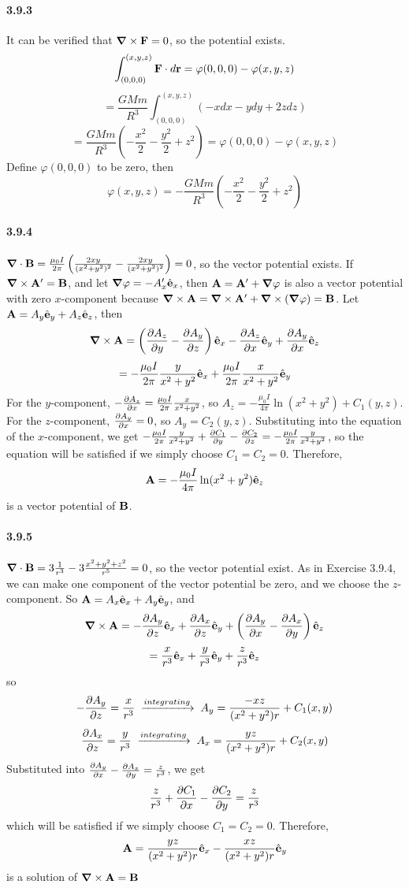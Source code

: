 \documentclass[a4paper]{article}
\begin{document}
\paragraph{3.9.3}
It can be verified that $\boldsymbol{\nabla}\times\mathbf{F}=0$, so the potential exists. 
\[
\int_{(0,0,0)}^{(x,y,z)}\mathbf{F}\cdot d\mathbf{r}=\varphi(0,0,0)-\varphi(x,y,z)
\]
\[
=\frac{GMm}{R^3}\int_{(0,0,0)}^{(x,y,z)}(-xdx-ydy+2zdz)
\]
\[
=\frac{GMm}{R^3}\left(-\frac{x^2}{2}-\frac{y^2}{2}+z^2 \right)=\varphi(0,0,0)-\varphi(x,y,z)
\]
Define $\varphi(0,0,0)$ to be zero, then \[\varphi(x,y,z)=-\frac{GMm}{R^3}\left(-\frac{x^2}{2}-\frac{y^2}{2}+z^2 \right)\] 

\paragraph{3.9.4}
$\boldsymbol{\nabla}\cdot\mathbf{B}=\frac{\mu_0I}{2\pi}\left(\frac{2xy}{(x^2+y^2)^2}-\frac{2xy}{(x^2+y^2)^2} \right)=0$, so the vector potential exists. If $\boldsymbol{\nabla}\times\mathbf{A}'=\mathbf{B}$, and let $\boldsymbol{\nabla}\varphi=-A_x'\hat{\mathbf{e}}_x$, then $\mathbf{A}=\mathbf{A}'+\boldsymbol{\nabla}\varphi$ is also a vector potential with zero $x$-component because  $\boldsymbol{\nabla}\times\mathbf{A}=\boldsymbol{\nabla}\times\mathbf{A}'+\boldsymbol{\nabla}\times(\boldsymbol{\nabla}\varphi)=\mathbf{B}$. Let $\mathbf{A}=A_y\hat{\mathbf{e}}_y+A_z\hat{\mathbf{e}}_z$, then 
\[
\boldsymbol{\nabla}\times\mathbf{A}=\left(\frac{\partial A_z}{\partial y}-\frac{\partial A_y}{\partial z} \right)\hat{\mathbf{e}}_x-\frac{\partial A_z}{\partial x}\hat{\mathbf{e}}_y+\frac{\partial A_y}{\partial x}\hat{\mathbf{e}}_z
\]
\[
=-\frac{\mu_0I}{2\pi}\frac{y}{x^2+y^2}\hat{\mathbf{e}}_x+\frac{\mu_0I}{2\pi}\frac{x}{x^2+y^2}\hat{\mathbf{e}}_y
\]
For the $y$-component, $-\frac{\partial A_z}{\partial x}=\frac{\mu_0I}{2\pi}\frac{x}{x^2+y^2}$, so $A_z=-\frac{\mu_0I}{4\pi}\ln(x^2+y^2)+C_1(y,z)$. For the $z$-component, $\frac{\partial A_y}{\partial x}=0$, so $A_y=C_2(y,z)$. Substituting into the equation of the $x$-component, we get $-\frac{\mu_0I}{2\pi}\frac{y}{x^2+y^2}+\frac{\partial C_1}{\partial y}-\frac{\partial C_2}{\partial z}=-\frac{\mu_0I}{2\pi}\frac{y}{x^2+y^2}$, so the equation will be satisfied if we simply choose $C_1=C_2=0$. Therefore, 
\[
\mathbf{A}=-\frac{\mu_0I}{4\pi}\ln(x^2+y^2)\hat{\mathbf{e}}_z
\]
is a vector potential of $\mathbf{B}$.

\paragraph{3.9.5}
$\boldsymbol{\nabla}\cdot\mathbf{B}=3\frac{1}{r^3}-3\frac{x^2+y^2+z^2}{r^5}=0$, so the vector potential exist. As in Exercise 3.9.4, we can make one component of the vector potential be zero, and we choose the $z$-component. So $\mathbf{A}=A_x\hat{\mathbf{e}}_x+A_y\hat{\mathbf{e}}_y$, and
\[
\boldsymbol{\nabla}\times\mathbf{A}=-\frac{\partial A_y}{\partial z}\hat{\mathbf{e}}_x+\frac{\partial A_x}{\partial z}\hat{\mathbf{e}}_y+\left(\frac{\partial A_y}{\partial x}-\frac{\partial A_x}{\partial y} \right)\hat{\mathbf{e}}_z
\]
\[
=\frac{x}{r^3}\hat{\mathbf{e}}_x+\frac{y}{r^3}\hat{\mathbf{e}}_y+\frac{z}{r^3}\hat{\mathbf{e}}_z
\]
so
\[
-\frac{\partial A_y}{\partial z}=\frac{x}{r^3}\;\xrightarrow{integrating}\;A_y=\frac{-xz}{(x^2+y^2)r}+C_1(x,y)
\]
\[
\frac{\partial A_x}{\partial z}=\frac{y}{r^3}\;\xrightarrow{integrating}\;A_x=\frac{yz}{(x^2+y^2)r}+C_2(x,y)
\]
Substituted into $\frac{\partial A_y}{\partial x}-\frac{\partial A_x}{\partial y}=\frac{z}{r^3}$, we get
\[
\frac{z}{r^3}+\frac{\partial C_1}{\partial x}-\frac{\partial C_2}{\partial y}=\frac{z}{r^3}
\]
which will be satisfied if we simply choose $C_1=C_2=0$. Therefore, 
\[
\mathbf{A}=\frac{yz}{(x^2+y^2)r}\hat{\mathbf{e}}_x-\frac{xz}{(x^2+y^2)r}\hat{\mathbf{e}}_y
\]
is a solution of $\boldsymbol{\nabla}\times\mathbf{A}=\mathbf{B}$
\end{document}
